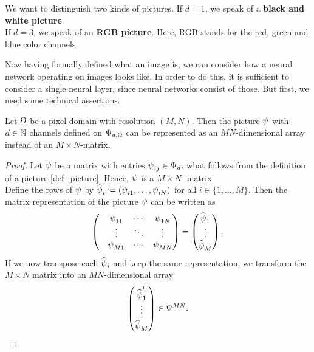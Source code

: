 \begin{remark}
We want to distinguish two kinds of pictures. If $d=1$, we speak of a \textbf{black and white picture}.\\
If $d=3$, we speak of an \textbf{RGB picture}. Here, RGB stands for the  red, green and blue color channels.
\end{remark}

Now having formally defined what an image is, we can consider how a neural network operating on images looks like. In order to do this, it is sufficient to consider  a single neural layer, since neural networks consist of those. But first, we need some technical assertions.

\begin{lemma}\label{mat_as_array}
Let $\Omega$ be a pixel domain with resolution $(M,N)$. Then the picture $\operatorname{\psi}$  with $d\in\operatorname{\mathbb{N}}$ channels defined on $\Psi_{d,\Omega}$ can be represented as an $MN$-dimensional array instead of an $M\times N$-matrix.
\end{lemma}

\begin{proof}
Let $\operatorname{\psi}$ be a matrix with entries $\operatorname{\psi}_{ij}\in\Psi_d$, what follows from the definition of a picture \ref{def_picture}. Hence, $\operatorname{\psi}$ is a $M\times N$- matrix.\\
Define the rows of $\operatorname{\psi}$ by $\widehat{\operatorname{\psi}}_i\coloneqq (\operatorname{\psi}_{i1},\ldots,\operatorname{\psi}_{iN})$ for all $i\in \{1,\ldots,M\}$. Then the matrix representation of the picture $\operatorname{\psi}$ can be written as
\begin{align*}
\begin{pmatrix}
&\operatorname{\psi}_{11} &\cdots &\operatorname{\psi}_{1N}\\
&\vdots  &\ddots		 &\vdots\\
&\operatorname{\psi}_{M1} &\cdots &\operatorname{\psi}_{MN}
\end{pmatrix}=
\begin{pmatrix}
\widehat{\operatorname{\psi}}_1\\
\vdots\\
\widehat{\operatorname{\psi}}_M
\end{pmatrix}.
\end{align*}
If we now transpose each $\widehat{\operatorname{\psi}}_i$ and keep the same representation, we transform the $M\times N$ matrix into an $MN$-dimensional array
\begin{align*}
 \begin{pmatrix}
\widehat{\operatorname{\psi}}^{^{\mkern-1.5mu\mathsf{T}}}_1\\
\vdots\\
\widehat{\operatorname{\psi}}^{^{\mkern-1.5mu\mathsf{T}}}_M
\end{pmatrix} \in \Psi^{MN}.
\end{align*}
\end{proof}

